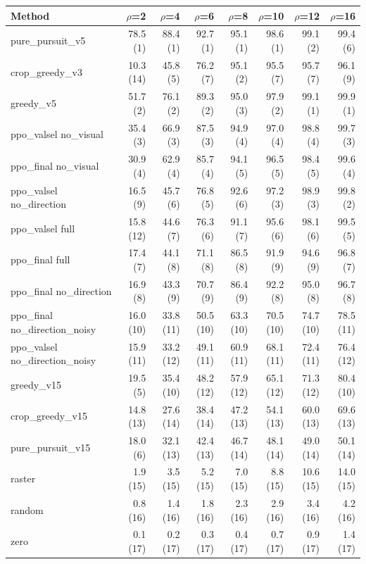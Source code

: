 \begin{tabular}{lrrrrrrr}
\toprule
Method & $\rho$=2 & $\rho$=4 & $\rho$=6 & $\rho$=8 & $\rho$=10 & $\rho$=12 & $\rho$=16 \\
\midrule
pure\_pursuit\_v5 & 78.5 (1) & 88.4 (1) & 92.7 (1) & 95.1 (1) & 98.6 (1) & 99.1 (2) & 99.4 (6) \\
crop\_greedy\_v3 & 10.3 (14) & 45.8 (5) & 76.2 (7) & 95.1 (2) & 95.5 (7) & 95.7 (7) & 96.1 (9) \\
greedy\_v5 & 51.7 (2) & 76.1 (2) & 89.3 (2) & 95.0 (3) & 97.9 (2) & 99.1 (1) & 99.9 (1) \\
ppo\_valsel no\_visual & 35.4 (3) & 66.9 (3) & 87.5 (3) & 94.9 (4) & 97.0 (4) & 98.8 (4) & 99.7 (3) \\
ppo\_final no\_visual & 30.9 (4) & 62.9 (4) & 85.7 (4) & 94.1 (5) & 96.5 (5) & 98.4 (5) & 99.6 (4) \\
ppo\_valsel no\_direction & 16.5 (9) & 45.7 (6) & 76.8 (5) & 92.6 (6) & 97.2 (3) & 98.9 (3) & 99.8 (2) \\
ppo\_valsel full & 15.8 (12) & 44.6 (7) & 76.3 (6) & 91.1 (7) & 95.6 (6) & 98.1 (6) & 99.5 (5) \\
ppo\_final full & 17.4 (7) & 44.1 (8) & 71.1 (8) & 86.5 (8) & 91.9 (9) & 94.6 (9) & 96.8 (7) \\
ppo\_final no\_direction & 16.9 (8) & 43.3 (9) & 70.7 (9) & 86.4 (9) & 92.2 (8) & 95.0 (8) & 96.7 (8) \\
ppo\_final no\_direction\_noisy & 16.0 (10) & 33.8 (11) & 50.5 (10) & 63.3 (10) & 70.5 (10) & 74.7 (10) & 78.5 (11) \\
ppo\_valsel no\_direction\_noisy & 15.9 (11) & 33.2 (12) & 49.1 (11) & 60.9 (11) & 68.1 (11) & 72.4 (11) & 76.4 (12) \\
greedy\_v15 & 19.5 (5) & 35.4 (10) & 48.2 (12) & 57.9 (12) & 65.1 (12) & 71.3 (12) & 80.4 (10) \\
crop\_greedy\_v15 & 14.8 (13) & 27.6 (14) & 38.4 (14) & 47.2 (13) & 54.1 (13) & 60.0 (13) & 69.6 (13) \\
pure\_pursuit\_v15 & 18.0 (6) & 32.1 (13) & 42.4 (13) & 46.7 (14) & 48.1 (14) & 49.0 (14) & 50.1 (14) \\
raster & 1.9 (15) & 3.5 (15) & 5.2 (15) & 7.0 (15) & 8.8 (15) & 10.6 (15) & 14.0 (15) \\
random & 0.8 (16) & 1.4 (16) & 1.8 (16) & 2.3 (16) & 2.9 (16) & 3.4 (16) & 4.2 (16) \\
zero & 0.1 (17) & 0.2 (17) & 0.3 (17) & 0.4 (17) & 0.7 (17) & 0.9 (17) & 1.4 (17) \\
\bottomrule
\end{tabular}